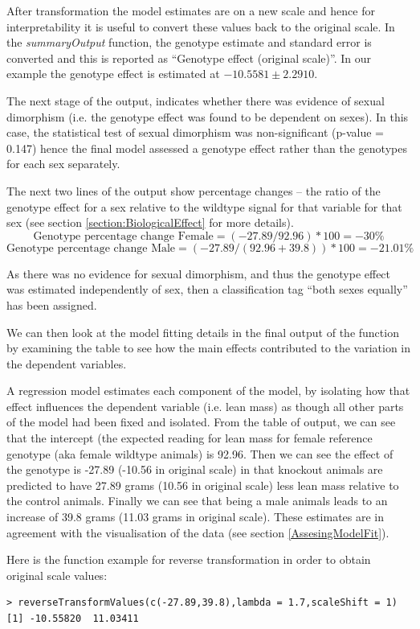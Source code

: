 \documentclass[12pt,a4paper]{article}
\begin{document}
After transformation the model estimates are on a new scale and hence for interpretability it is useful to convert these values back to the original scale.  In the \textit{summaryOutput} function, the genotype estimate and standard error is converted and this is reported as “Genotype effect (original scale)”. In our example the genotype effect is estimated at $-10.5581 \pm 2.2910$. 

The next stage of the output, indicates whether there was evidence of sexual dimorphism (i.e. the genotype effect was found to be dependent on sexes).  
In this case, the statistical test of sexual dimorphism was non-significant (p-value = 0.147) hence the final model assessed a genotype effect rather than the genotypes for each sex separately.  

The next two lines of the output show percentage changes --  the ratio of the genotype effect for a sex relative to the wildtype signal for that variable for that sex (see section \ref{section:BiologicalEffect} for more details).
\[
\text{Genotype percentage change Female} = (-27.89/92.96)*100=-30\%
\] 
\[
\text{Genotype percentage change Male} = (-27.89/(92.96+39.8))*100=-21.01\%
\]

As there was no evidence for sexual dimorphism, and thus the genotype effect was estimated independently of sex, then a classification tag “both sexes equally” has been assigned. 

We can then look at the model fitting details in the final output of the function by examining the table to see how the main effects contributed to the variation in the dependent variables. 

A regression model estimates each component of the model, by isolating how that effect influences the dependent variable (i.e. lean mass) as though all other parts of the model had been fixed and isolated.   
From the table of output, we can see that the intercept (the expected reading for lean mass for female reference genotype (aka female wildtype animals) is 92.96.  
Then we can see the effect of the genotype is -27.89 (-10.56 in original scale) in that knockout animals are predicted to have 27.89 grams (10.56 in original scale) less lean mass relative to the control animals.  
Finally we can see that being a male animals leads to an increase of 39.8 grams (11.03 grams in original scale).  
These estimates are in agreement with the visualisation of the data (see section \ref{AssesingModelFit}). 
 
Here is the function example for reverse transformation in order to obtain original scale values: 
\begingroup
    \fontsize{8pt}{12pt}\selectfont
\begin{verbatim}
> reverseTransformValues(c(-27.89,39.8),lambda = 1.7,scaleShift = 1)
[1] -10.55820  11.03411
\end{verbatim}
\endgroup  
\end{document}
